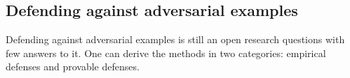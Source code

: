 





\subsection{Defending against adversarial examples}

Defending against adversarial examples is still an open research questions with few answers to it. One can derive the methods in two categories: empirical defenses and provable defenses.

